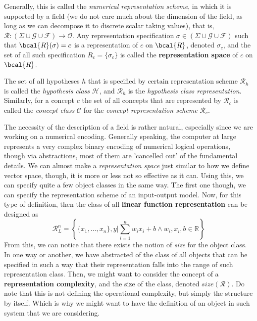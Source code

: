 \documentclass[10pt]{article} %
\begin{document}
Generally, this is called the \textit{numerical representation scheme}, in which it is supported by a field (we do not care much about the dimension of the field, as long as we can decompose it to discrete scalar taking values), that is, $\bm{\mathcal{R}}:(\Sigma \cup \mathcal{G}\cup \mathcal{F})\to \mathcal{O}$. Any representation specification $\sigma\in (\Sigma \cup \mathcal{G}\cup \mathcal{F})$ such that $\bcal{R}(\sigma) = c$ is a representation of $c$ on $\bcal{R}$, denoted $\sigma_{c}$, and the set of all such specification $R_{c}=\{\sigma_{c}\}$ is called the \textbf{representation space} of $c$ on $\bcal{R}$.

The set of all hypotheses $h$ that is specified by certain representation scheme $\bm{\mathcal{R}}_{h}$ is called the \textit{hypothesis class} $\mathcal{H}$, and $\bm{\mathcal{R}}_{h}$ is the \textit{hypothesis class representation}. Similarly, for a concept $c$ the set of all concepts that are represented by $\bm{\mathcal{R}}_{c}$ is called the \textit{concept class} $\mathcal{C}$ for the \textit{concept representation scheme} $\bm{\mathcal{R}}_{c}$.

The necessity of the description of a field is rather natural, especially since we are working on a numerical encoding. Generally speaking, the computer at large represents a very complex binary encoding of numerical logical operations, though via abstractions, most of them are 'cancelled out' of the fundamental details. We can almost make a \textit{representation space} just similar to how we define vector space, though, it is more or less not so effective as it can.
Using this, we can specify quite a few object classes in the same way. The first one though, we can specify the representation scheme of an input-output model. Now, for this type of definition, then the class of all \textbf{linear function representation} can be designed as 
\begin{equation}
    \bm{\mathcal{R}}_{L}^{n} = \left\{ \{x_{1},\dots,x_{n}\}, y \Bigg| \sum_{i=1}^{n}w_{i}x_{i} + b \land w_{i}, x_{i}, b \in \mathbb{R} \right\}
\end{equation}
From this, we can notice that there exists the notion of \textit{size} for the object class. In one way or another, we have abstracted of the class of all objects that can be specified in such a way that their representation falls into the range of such representation class. Then, we might want to consider the concept of a \textbf{representation complexity}, and the size of the class, denoted $size(\bm{\mathcal{R}})$. Do note that this is not defining the operational complexity, but simply the structure by itself. Which is why we might want to have the definition of an object in such system that we are considering.
\end{document}
